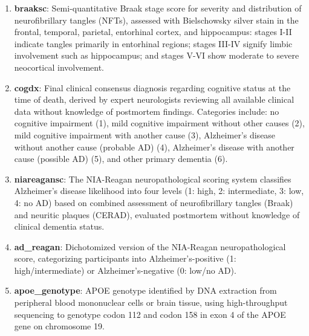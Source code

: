 \begin{enumerate}
    \item \textbf{braaksc}: Semi-quantitative Braak stage score for severity and distribution of neurofibrillary tangles (NFTs), assessed with Bielschowsky silver stain in the frontal, temporal, parietal, entorhinal cortex, and hippocampus: stages I-II indicate tangles primarily in entorhinal regions; stages III-IV signify limbic involvement such as hippocampus; and stages V-VI show moderate to severe neocortical involvement.
    
    \item \textbf{cogdx}: Final clinical consensus diagnosis regarding cognitive status at the time of death, derived by expert neurologists reviewing all available clinical data without knowledge of postmortem findings. Categories include: no cognitive impairment (1), mild cognitive impairment without other causes (2), mild cognitive impairment with another cause (3), Alzheimer's disease without another cause (probable AD) (4), Alzheimer's disease with another cause (possible AD) (5), and other primary dementia (6).
    
    \item \textbf{niareagansc}: The NIA-Reagan neuropathological scoring system classifies Alzheimer's disease likelihood into four levels (1: high, 2: intermediate, 3: low, 4: no AD) based on combined assessment of neurofibrillary tangles (Braak) and neuritic plaques (CERAD), evaluated postmortem without knowledge of clinical dementia status.
    
    \item \textbf{ad\_reagan}: Dichotomized version of the NIA-Reagan neuropathological score, categorizing participants into Alzheimer's-positive (1: high/intermediate) or Alzheimer's-negative (0: low/no AD).
    
    \item \textbf{apoe\_genotype}: APOE genotype identified by DNA extraction from peripheral blood mononuclear cells or brain tissue, using high-throughput sequencing to genotype codon 112 and codon 158 in exon 4 of the APOE gene on chromosome 19.
\end{enumerate}